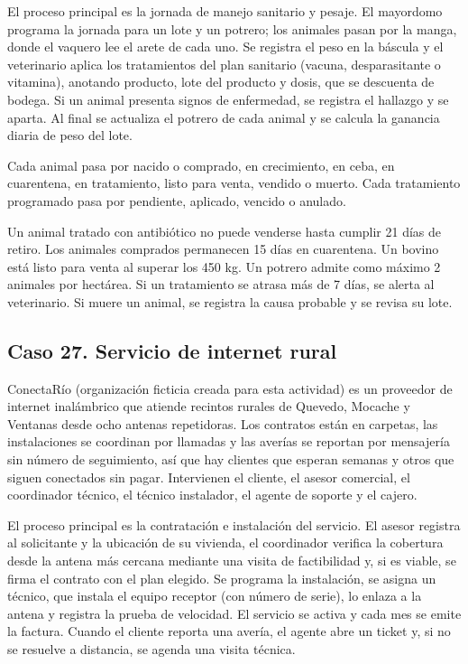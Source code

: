 \documentclass[11pt]{article}
\newcommand{\subseccion}[1]{\subsection{\textcolor{midblue}{#1}}}
\begin{document}
El proceso principal es la jornada de manejo sanitario y pesaje. El mayordomo programa la jornada para un lote y un potrero; los animales pasan por la manga, donde el vaquero lee el arete de cada uno. Se registra el peso en la báscula y el veterinario aplica los tratamientos del plan sanitario (vacuna, desparasitante o vitamina), anotando producto, lote del producto y dosis, que se descuenta de bodega. Si un animal presenta signos de enfermedad, se registra el hallazgo y se aparta. Al final se actualiza el potrero de cada animal y se calcula la ganancia diaria de peso del lote.

Cada animal pasa por nacido o comprado, en crecimiento, en ceba, en cuarentena, en tratamiento, listo para venta, vendido o muerto. Cada tratamiento programado pasa por pendiente, aplicado, vencido o anulado.

Un animal tratado con antibiótico no puede venderse hasta cumplir 21 días de retiro. Los animales comprados permanecen 15 días en cuarentena. Un bovino está listo para venta al superar los 450 kg. Un potrero admite como máximo 2 animales por hectárea. Si un tratamiento se atrasa más de 7 días, se alerta al veterinario. Si muere un animal, se registra la causa probable y se revisa su lote.

\subseccion{Caso 27. Servicio de internet rural}
ConectaRío (organización ficticia creada para esta actividad) es un proveedor de internet inalámbrico que atiende recintos rurales de Quevedo, Mocache y Ventanas desde ocho antenas repetidoras. Los contratos están en carpetas, las instalaciones se coordinan por llamadas y las averías se reportan por mensajería sin número de seguimiento, así que hay clientes que esperan semanas y otros que siguen conectados sin pagar. Intervienen el cliente, el asesor comercial, el coordinador técnico, el técnico instalador, el agente de soporte y el cajero.

El proceso principal es la contratación e instalación del servicio. El asesor registra al solicitante y la ubicación de su vivienda, el coordinador verifica la cobertura desde la antena más cercana mediante una visita de factibilidad y, si es viable, se firma el contrato con el plan elegido. Se programa la instalación, se asigna un técnico, que instala el equipo receptor (con número de serie), lo enlaza a la antena y registra la prueba de velocidad. El servicio se activa y cada mes se emite la factura. Cuando el cliente reporta una avería, el agente abre un ticket y, si no se resuelve a distancia, se agenda una visita técnica.
\end{document}
